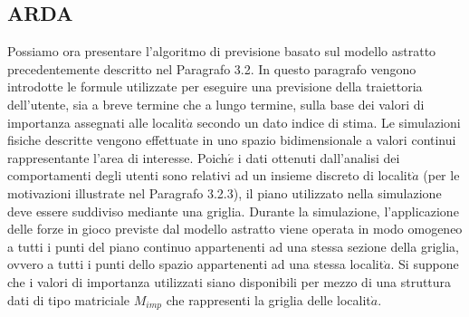 \subsection{ARDA}
Possiamo ora presentare l'algoritmo di previsione basato sul modello astratto
precedentemente descritto nel Paragrafo 3.2. In questo paragrafo vengono
introdotte le formule utilizzate per eseguire una previsione della traiettoria
dell'utente, sia a breve termine che a lungo termine, sulla base dei valori di
importanza assegnati alle localit$\grave{a}$ secondo un dato indice di stima.
Le simulazioni fisiche descritte vengono effettuate in uno spazio bidimensionale
a valori continui rappresentante l'area di interesse. Poich$\acute{e}$ i dati ottenuti
dall'analisi dei comportamenti degli utenti sono relativi ad un insieme
discreto di localit$\grave{a}$ (per le motivazioni illustrate nel Paragrafo 3.2.3), il piano
utilizzato nella simulazione deve essere suddiviso mediante una griglia. Durante
la simulazione, l'applicazione delle forze in gioco previste dal modello
astratto viene operata in modo omogeneo a tutti i punti del piano continuo
appartenenti ad una stessa sezione della griglia, ovvero a tutti i punti dello
spazio appartenenti ad una stessa localit$\grave{a}$.
Si suppone che i valori di importanza utilizzati siano disponibili per mezzo
di una struttura dati di tipo matriciale $M_{imp}$ che rappresenti la griglia delle
localit$\grave{a}$.


